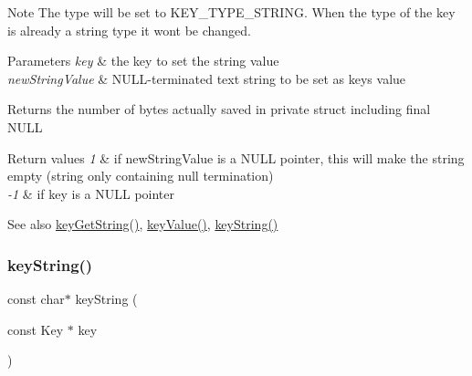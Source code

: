 \begin{DoxyNote}{Note}
The type will be set to K\+E\+Y\+\_\+\+T\+Y\+P\+E\+\_\+\+S\+T\+R\+I\+NG. When the type of the key is already a string type it won\textquotesingle{}t be changed.
\end{DoxyNote}

\begin{DoxyParams}{Parameters}
{\em key} & the key to set the string value \\
\hline
{\em new\+String\+Value} & N\+U\+L\+L-\/terminated text string to be set as {\ttfamily key\textquotesingle{}s} value \\
\hline
\end{DoxyParams}
\begin{DoxyReturn}{Returns}
the number of bytes actually saved in private struct including final N\+U\+LL 
\end{DoxyReturn}

\begin{DoxyRetVals}{Return values}
{\em 1} & if new\+String\+Value is a N\+U\+LL pointer, this will make the string empty (string only containing null termination) \\
\hline
{\em -\/1} & if key is a N\+U\+LL pointer \\
\hline
\end{DoxyRetVals}
\begin{DoxySeeAlso}{See also}
\mbox{\hyperlink{group__keyvalue_ga41b9fac5ccddafe407fc0ae1e2eb8778}{key\+Get\+String()}}, \mbox{\hyperlink{group__keyvalue_ga6f29609c5da53c6dc26a98678d5752af}{key\+Value()}}, \mbox{\hyperlink{group__keyvalue_ga880936f2481d28e6e2acbe7486a21d05}{key\+String()}} 
\end{DoxySeeAlso}
\mbox{\label{group__keyvalue_ga880936f2481d28e6e2acbe7486a21d05}} 
\subsubsection{\texorpdfstring{keyString()}{keyString()}}
{\footnotesize\ttfamily const char$\ast$ key\+String (\begin{DoxyParamCaption}\item[{const Key $\ast$}]{key }\end{DoxyParamCaption})}



